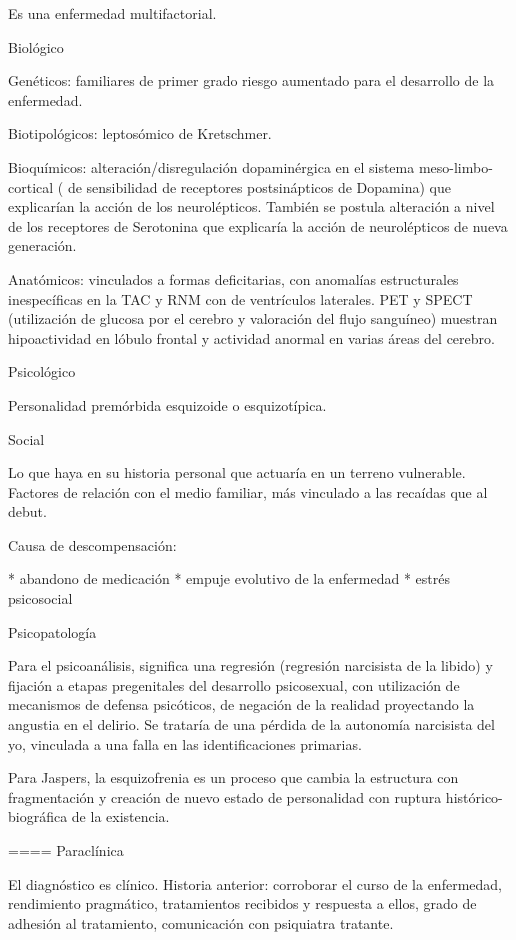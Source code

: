 \documentclass[encares.tex]{subfiles}
\begin{document}
Es una enfermedad multifactorial.

Biológico

Genéticos: familiares de primer grado riesgo aumentado para el desarrollo de la enfermedad.

Biotipológicos: leptosómico de Kretschmer.

Bioquímicos: alteración/disregulación dopaminérgica en el sistema meso-limbo-cortical ( de sensibilidad de receptores postsinápticos de Dopamina) que explicarían la acción de los neurolépticos. También se postula alteración a nivel de los receptores de Serotonina que explicaría la acción de neurolépticos de nueva generación.

Anatómicos: vinculados a formas deficitarias, con anomalías estructurales inespecíficas en la TAC y RNM con de ventrículos laterales. PET y SPECT (utilización de glucosa por el cerebro y valoración del flujo sanguíneo) muestran hipoactividad en lóbulo frontal y actividad anormal en varias áreas del cerebro.

Psicológico

Personalidad premórbida esquizoide o esquizotípica.

Social

Lo que haya en su historia personal que actuaría en un terreno vulnerable. Factores de relación con el medio familiar, más vinculado a las recaídas que al debut.

Causa de descompensación:

* abandono de medicación
* empuje evolutivo de la enfermedad
* estrés psicosocial

Psicopatología

Para el psicoanálisis, significa una regresión (regresión narcisista de la libido) y fijación a etapas pregenitales del desarrollo psicosexual, con utilización de mecanismos de defensa psicóticos, de negación de la realidad proyectando la angustia en el delirio. Se trataría de una pérdida de la autonomía narcisista del yo, vinculada a una falla en las identificaciones primarias.

Para Jaspers, la esquizofrenia es un proceso que cambia la estructura con fragmentación y creación de nuevo estado de personalidad con ruptura histórico-biográfica de la existencia.

==== Paraclínica

El diagnóstico es clínico. Historia anterior: corroborar el curso de la enfermedad, rendimiento pragmático, tratamientos recibidos y respuesta a ellos, grado de adhesión al tratamiento, comunicación con psiquiatra tratante.
\end{document}
